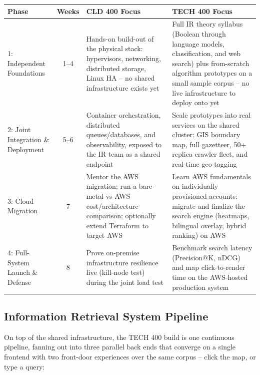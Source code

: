 \documentclass[10pt, a4paper]{article}
\begin{document}
\begin{table}[H]
\centering
\small
\renewcommand{\arraystretch}{1.3}
\begin{tabularx}{\textwidth}{|X|c|X|X|}
\hline
\rowcolor{lightgray}
Phase & Weeks & CLD 400 Focus & TECH 400 Focus \\ \hline
1: Independent Foundations & 1--4 & Hands-on build-out of the physical stack: hypervisors, networking, distributed storage, Linux HA -- no shared infrastructure exists yet & Full IR theory syllabus (Boolean through language models, classification, and web search) plus from-scratch algorithm prototypes on a small sample corpus -- no live infrastructure to deploy onto yet \\ \hline
2: Joint Integration \& Deployment & 5--6 & Container orchestration, distributed queues/databases, and observability, exposed to the IR team as a shared endpoint & Scale prototypes into real services on the shared cluster: GIS boundary map, full gazetteer, 50+ replica crawler fleet, and real-time geo-tagging \\ \hline
3: Cloud Migration & 7 & Mentor the AWS migration; run a bare-metal-vs-AWS cost/architecture comparison; optionally extend Terraform to target AWS & Learn AWS fundamentals on individually provisioned accounts; migrate and finalize the search engine (heatmaps, bilingual overlay, hybrid ranking) on AWS \\ \hline
4: Full-System Launch \& Defense & 8 & Prove on-premise infrastructure resilience live (kill-node test) during the joint load test & Benchmark search latency (Precision@K, nDCG) and map click-to-render time on the AWS-hosted production system \\ \hline
\end{tabularx}
\end{table}

\subsection*{Information Retrieval System Pipeline}
On top of the shared infrastructure, the TECH 400 build is one continuous pipeline, fanning out into three parallel back ends that converge on a single frontend with two front-door experiences over the same corpus -- click the map, or type a query:
\end{document}
